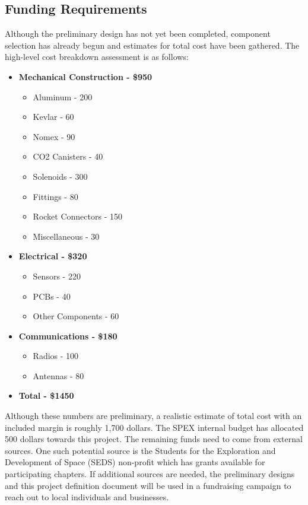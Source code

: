 \documentclass[conference]{IEEEtran} %
\begin{document}
\subsection{Funding Requirements}
\label{subsec:Funding Requirements}
Although the preliminary design has not yet been completed, component selection has already begun and estimates for total cost have been
gathered. The high-level cost breakdown assessment is as follows:
\begin{itemize}
  \item \textbf{Mechanical Construction - \$950}
  \begin{itemize}
    \item Aluminum - 200
    \item Kevlar - 60
    \item Nomex - 90
    \item CO2 Canisters - 40
    \item Solenoids - 300
    \item Fittings - 80
    \item Rocket Connectors - 150
    \item Miscellaneous - 30
  \end{itemize}

  \item \textbf{Electrical - \$320}
  \begin{itemize}
    \item Sensors - 220
    \item PCBs - 40
    \item Other Components - 60
  \end{itemize}

  \item \textbf{Communications - \$180}
  \begin{itemize}
    \item Radios - 100
    \item Antennas - 80
  \end{itemize}

  \item \textbf{Total - \$1450}
\end{itemize}

Although these numbers are preliminary, a realistic estimate of total cost with an included margin is roughly 1,700 dollars. The SPEX internal budget has allocated 500 dollars
towards this project. The remaining funds need to come from external sources. One such potential source is the Students for the Exploration and Development
of Space (SEDS) non-profit which has grants available for participating chapters. If additional sources are needed, the preliminary designs and this
project definition document will be used in a fundraising campaign to reach out to local individuals and businesses.
\end{document}
